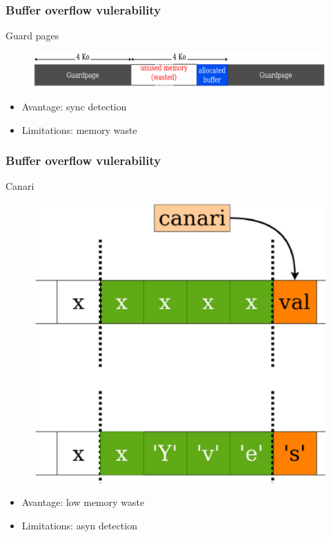 \documentclass[xcolor=table,bigger,unknownkeysallowed]{beamer}
\begin{document}
        \begin{frame}
        \frametitle{Buffer overflow vulerability} 
			\begin{block}{Guard pages}
 		    \begin{figure}
			\centering
				\includegraphics[width=.7\columnwidth]{fig/guard}
			\end{figure}			
				\begin{itemize}
					\item Avantage: sync detection
					\item Limitations: memory waste
				\end{itemize}
			\end{block}		
        \end{frame}           
        \begin{frame}
        \frametitle{Buffer overflow vulerability} 
			\begin{block}{Canari}
 		    \begin{figure}
			\centering
				\includegraphics[width=.3\columnwidth]{fig/canari}
			\end{figure}			
				\begin{itemize}
					\item Avantage: low memory waste
					\item Limitations: asyn detection
				\end{itemize}
			\end{block}		
        \end{frame}
\end{document}

